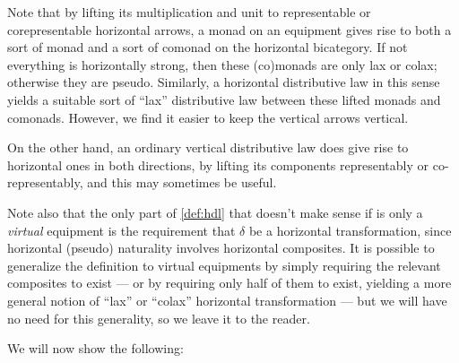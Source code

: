 \documentclass{amsart}
\newcommand{\K}{\bbK}
\begin{document}
Note that by lifting its multiplication and unit to representable or corepresentable horizontal arrows, a monad on an equipment gives rise to both a sort of monad and a sort of comonad on the horizontal bicategory.
If not everything is horizontally strong, then these (co)monads are only lax or colax; otherwise they are pseudo.
Similarly, a horizontal distributive law in this sense yields a suitable sort of ``lax'' distributive law between these lifted monads and comonads.
However, we find it easier to keep the vertical arrows vertical.

On the other hand, an ordinary vertical distributive law does give rise to horizontal ones in both directions, by lifting its components representably or co-representably, and this may sometimes be useful.

Note also that the only part of \cref{def:hdl} that doesn't make sense if \K is only a \emph{virtual} equipment is the requirement that $\delta$ be a horizontal transformation, since horizontal (pseudo) naturality involves horizontal composites.
It is possible to generalize the definition to virtual equipments by simply requiring the relevant composites to exist --- or by requiring only half of them to exist, yielding a more general notion of ``lax'' or ``colax'' horizontal transformation --- but we will have no need for this generality, so we leave it to the reader.

We will now show the following:
\end{document}
